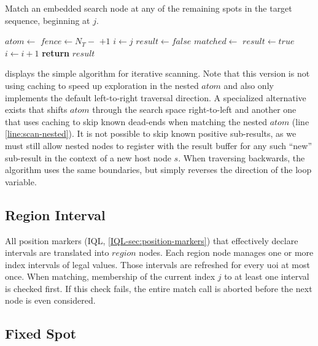 \documentclass[11pt,a4paper]{report}
\begin{document}
\begin{algorithm}[H]
	\caption[Iterative scan matching]{Match an embedded search node at any of the remaining spots in the target sequence, beginning at $j$.}
	\label{alg:match-scan}
	\begin{algorithmic}[1]
		\State $atom \gets$ 
		\State $fence \gets N_T -$  $ + 1$
		\State $i \gets j$
		\State $result \gets false$
		 
			\State $matched \gets$ \label{line:scan-nested}
				\State $result \gets true$
			\EndIf
			\State $i \gets i +1$
		\EndWhile
		\State \textbf{return} $result$
		\EndProcedure
	\end{algorithmic}
\end{algorithm}

 displays the simple algorithm for iterative scanning.
Note that this version is not using caching to speed up exploration in the nested $atom$ and also only implements the default left-to-right traversal direction.
A specialized alternative exists that shifts $atom$ through the search space right-to-left and another one that uses caching to skip known dead-ends when matching the nested $atom$ (line \ref{line:scan-nested}).
It is not possible to skip known positive sub-results, as we must still allow nested nodes to register with the result buffer for any such ``new'' sub-result in the context of a new host node $s$.
When traversing backwards, the algorithm uses the same boundaries, but simply reverses the direction of the loop variable.

\subsection{Region Interval}
\label{sec:seq-region}

All position markers (IQL, \cref{IQL-sec:position-markers}) that effectively declare intervals are translated into $region$ nodes.
Each region node manages one or more index intervals of legal values.
Those intervals are refreshed for every \ac{uoi} at most once.
When matching, membership of the current index $j$ to at least one interval is checked first.
If this check fails, the entire match call is aborted before the next node is even considered.

\subsection{Fixed Spot}
\label{sec:seq-spot}
\end{document}
